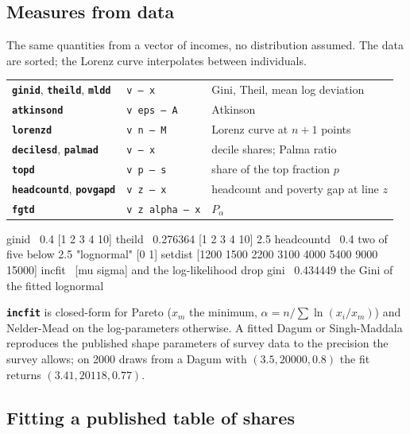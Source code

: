 \documentclass[11pt,letterpaper]{article}
\newcommand{\cmd}[1]{\texttt{\textbf{#1}}}
\newcommand{\stk}[1]{\texttt{#1}}
\begin{document}
\subsection{Measures from data}

The same quantities from a vector of incomes, no distribution assumed. The data are sorted; the Lorenz curve interpolates between individuals.
\begin{center}
\begin{tabular}{@{}l>{\raggedright\arraybackslash}p{}>{\raggedright\arraybackslash}p{}@{}}
\toprule
\cmd{ginid}, \cmd{theild}, \cmd{mldd} & \stk{v -- x} & Gini, Theil, mean log deviation \\
\cmd{atkinsond} & \stk{v eps -- A} & Atkinson \\
\cmd{lorenzd} & \stk{v n -- M} & Lorenz curve at $n+1$ points \\
\cmd{decilesd}, \cmd{palmad} & \stk{v -- x} & decile shares; Palma ratio \\
\cmd{topd} & \stk{v p -- s} & share of the top fraction $p$ \\
\cmd{headcountd}, \cmd{povgapd} & \stk{v z -- x} & headcount and poverty gap at line $z$ \\
\cmd{fgtd} & \stk{v z alpha -- x} & $P_\alpha$ \\
\bottomrule
\end{tabular}
\end{center}
\begin{rpn}
[1 2 3 4 10] ginid            \ 0.4
[1 2 3 4 10] theild           \ 0.276364
[1 2 3 4 10] 2.5 headcountd   \ 0.4       two of five below 2.5
"lognormal" [0 1] setdist
[1200 1500 2200 3100 4000 5400 9000 15000] incfit   \ [mu sigma] and the log-likelihood
drop gini                     \ 0.434449  the Gini of the fitted lognormal
\end{rpn}
\cmd{incfit} is closed-form for Pareto ($x_m$ the minimum, $\alpha = n / \sum \ln(x_i/x_m)$) and Nelder-Mead on the log-parameters otherwise. A fitted Dagum or Singh-Maddala reproduces the published shape parameters of survey data to the precision the survey allows; on 2000 draws from a Dagum with $(3.5, 20000, 0.8)$ the fit returns $(3.41, 20118, 0.77)$.

\subsection{Fitting a published table of shares}
\end{document}
